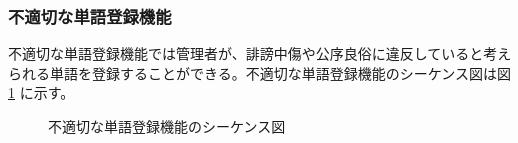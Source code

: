 \documentclass[a4j]{jarticle}
\begin{document}
  \subsubsection{不適切な単語登録機能}
  不適切な単語登録機能では管理者が、誹謗中傷や公序良俗に違反していると考えられる単語を登録することができる。不適切な単語登録機能のシーケンス図は図 \ref{fig:admin_bbs_wordentry.png} に示す。
  \begin{figure}[H]
    \centering
    \caption{不適切な単語登録機能のシーケンス図}
    \label{fig:admin_bbs_wordentry.png}
  \end{figure}
\end{document}
